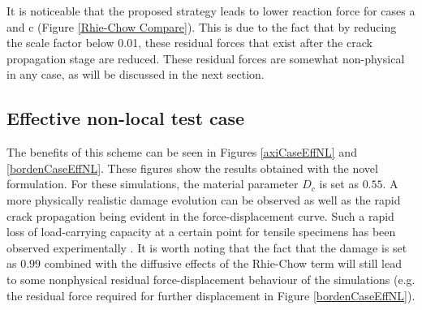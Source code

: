 \documentclass[sn-mathphys,Numbered,draft]{sn-jnl}%
\begin{document}
It is noticeable that the proposed strategy leads to lower reaction force for cases a and c (Figure \ref{Rhie-Chow Compare}). This is due to the fact that by reducing the scale factor below 0.01, these residual forces that exist after the crack propagation stage are reduced. These residual forces are somewhat non-physical in any case, as will be discussed in the next section.




\subsection{Effective non-local test case}

The benefits of this scheme can be seen in Figures \ref{axiCaseEffNL} and \ref{bordenCaseEffNL}. These figures show the results obtained with the novel formulation. For these simulations, the material parameter $D_c$ is set as $0.55$. A more physically realistic damage evolution can be observed as well as the rapid crack propagation being evident in the force-displacement curve. Such a rapid loss of load-carrying capacity at a certain point for tensile specimens has been observed experimentally \cite{li_ductile_2011,malcher_improved_2014}. It is worth noting that the fact that the damage is set as $0.99$ combined with the diffusive effects of the Rhie-Chow term will still lead to some nonphysical residual force-displacement behaviour of the simulations (e.g. the residual force required for further displacement in Figure \ref{bordenCaseEffNL}).
\end{document}
